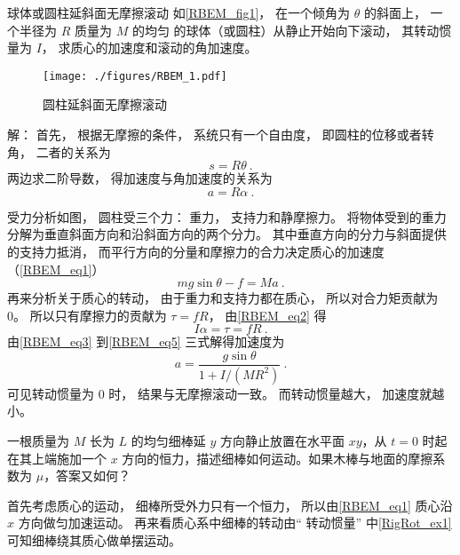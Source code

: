\begin{example}{球体或圆柱延斜面无摩擦滚动}\label{RBEM_ex1}
如\autoref{RBEM_fig1}， 在一个倾角为 $\theta$ 的斜面上， 一个半径为 $R$ 质量为 $M$ 的均匀 的球体（或圆柱）从静止开始向下滚动， 其转动惯量为 $I$， 求质心的加速度和滚动的角加速度。

\begin{figure}[ht]
\centering
\texttt{[image: ./figures/RBEM\_1.pdf]}
\caption{圆柱延斜面无摩擦滚动} \label{RBEM_fig1}
\end{figure}

解： 首先， 根据无摩擦的条件， 系统只有一个自由度， 即圆柱的位移或者转角， 二者的关系为
\begin{equation}
s = R\theta~.
\end{equation}
两边求二阶导数， 得加速度与角加速度的关系为
\begin{equation}\label{RBEM_eq3}
a = R\alpha~.
\end{equation}

受力分析如图， 圆柱受三个力： 重力， 支持力和静摩擦力。 将物体受到的重力分解为垂直斜面方向和沿斜面方向的两个分力。 其中垂直方向的分力与斜面提供的支持力抵消， 而平行方向的分量和摩擦力的合力决定质心的加速度（\autoref{RBEM_eq1}）
\begin{equation}\label{RBEM_eq4}
mg\sin\theta - f = Ma~.
\end{equation}
再来分析关于质心的转动， 由于重力和支持力都在质心， 所以对合力矩贡献为 0。 所以只有摩擦力的贡献为 $\tau = fR$， 由\autoref{RBEM_eq2} 得
\begin{equation}\label{RBEM_eq5}
I\alpha = \tau = f R~.
\end{equation}
由\autoref{RBEM_eq3} 到\autoref{RBEM_eq5} 三式解得加速度为
\begin{equation}
a = \frac{g \sin\theta}{1 + I/(MR^2)}~.
\end{equation}
可见转动惯量为 0 时， 结果与无摩擦滚动一致。 而转动惯量越大， 加速度就越小。
\end{example}

\begin{example}{}
一根质量为 $M$ 长为 $L$ 的均匀细棒延 $y$ 方向静止放置在水平面 $xy$，从 $t=0$ 时起在其上端施加一个 $x$ 方向的恒力，描述细棒如何运动。如果木棒与地面的摩擦系数为 $\mu$，答案又如何？

首先考虑质心的运动， 细棒所受外力只有一个恒力， 所以由\autoref{RBEM_eq1} 质心沿 $x$ 方向做匀加速运动。 再来看质心系中细棒的转动由“ 转动惯量” 中\autoref{RigRot_ex1} 可知细棒绕其质心做单摆运动。
\end{example}
